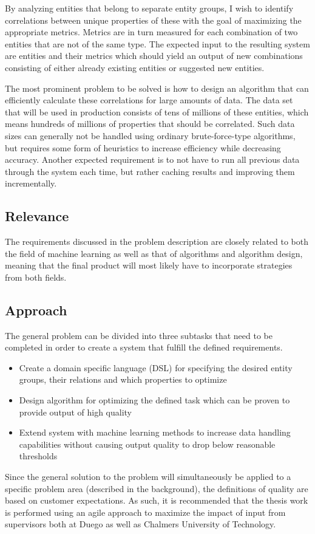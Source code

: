 \documentclass[a4paper]{article}
\begin{document}
By analyzing entities that belong to separate entity groups, I wish to identify correlations between unique properties of
these with the goal of maximizing the appropriate metrics. Metrics are in turn measured for each combination of two entities
that are not of the same type. The expected input to the resulting system are entities and their metrics which should yield
an output of new combinations consisting of either already existing entities or suggested new entities.

The most prominent problem to be solved is how to design an algorithm that can efficiently calculate these correlations for
large amounts of data. The data set that will be used in production consists of tens of millions of these entities, which
means hundreds of millions of properties that should be correlated. Such data sizes can generally not be handled using
ordinary brute-force-type algorithms, but requires some form of heuristics to increase efficiency while decreasing accuracy.
Another expected requirement is to not have to run all previous data through the system each time, but rather caching results
and improving them incrementally.

\subsection{Relevance}
The requirements discussed in the problem description are closely related to both the field of machine learning as well as
that of algorithms and algorithm design, meaning that the final product will most likely have to incorporate strategies from
both fields.

\subsection{Approach}
\label{sec:approach}
The general problem can be divided into three subtasks that need to be completed in order to create a system that fulfill the
defined requirements.
\begin{itemize}
	\item Create a domain specific language (DSL) for specifying the desired entity groups, their relations and which
	properties to optimize
	\item Design algorithm for optimizing the defined task which can be proven to provide output of high quality
	\item Extend system with machine learning methods to increase data handling capabilities without causing output quality to
	 drop below reasonable thresholds
\end{itemize}
Since the general solution to the problem will simultaneously be applied to a specific problem area (described in the
background), the definitions of quality are based on customer expectations. As such, it is recommended that the thesis work is
performed using an agile approach to maximize the impact of input from supervisors both at Duego as well as Chalmers University
of Technology.
\end{document}
